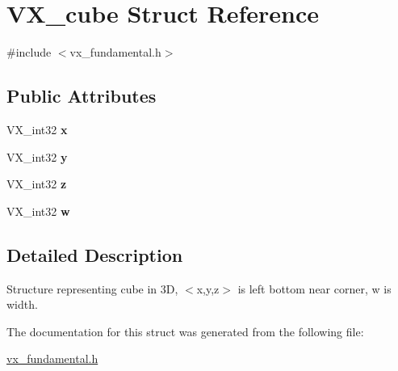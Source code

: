 \hypertarget{structVX__cube}{\section{V\-X\-\_\-cube Struct Reference}
\label{structVX__cube}
}


{\ttfamily \#include $<$vx\-\_\-fundamental.\-h$>$}

\subsection*{Public Attributes}
\begin{DoxyCompactItemize}
\item 
\hypertarget{structVX__cube_aa7fcf420728835b617cdf31686b95ce7}{V\-X\-\_\-int32 {\bfseries x}}\label{structVX__cube_aa7fcf420728835b617cdf31686b95ce7}

\item 
\hypertarget{structVX__cube_a294d9f98284daa3bdd372d02470695b0}{V\-X\-\_\-int32 {\bfseries y}}\label{structVX__cube_a294d9f98284daa3bdd372d02470695b0}

\item 
\hypertarget{structVX__cube_a68d7b445a990f14c6d8b31dda9799883}{V\-X\-\_\-int32 {\bfseries z}}\label{structVX__cube_a68d7b445a990f14c6d8b31dda9799883}

\item 
\hypertarget{structVX__cube_ae60e99932ef35773b2df0123e38240f3}{V\-X\-\_\-int32 {\bfseries w}}\label{structVX__cube_ae60e99932ef35773b2df0123e38240f3}

\end{DoxyCompactItemize}


\subsection{Detailed Description}
Structure representing cube in 3\-D, $<$x,y,z$>$ is left bottom near corner, w is width. 

The documentation for this struct was generated from the following file\-:\begin{DoxyCompactItemize}
\item 
\hyperlink{vx__fundamental_8h}{vx\-\_\-fundamental.\-h}\end{DoxyCompactItemize}
